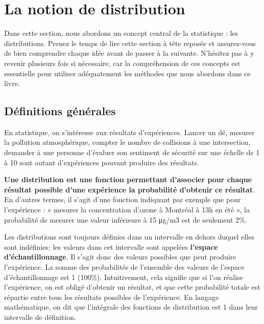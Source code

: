 \documentclass[
  11pt,
  french,
]{book}
\makeatletter
\newenvironment{kframev}{%
\medskip{}
\setlength{\fboxsep}{.8em}
 \def\at@end@of@kframev{}%
 \ifinner\ifhmode%
  \def\at@end@of@kframev{\end{minipage}}%
  \begin{minipage}{\columnwidth}%
 \fi\fi%
 \def\FrameCommand##1{\hskip\@totalleftmargin \hskip-\fboxsep
 \colorbox{shadebluecolor}{##1}\hskip-\fboxsep
     \hskip-\linewidth \hskip-\@totalleftmargin \hskip\columnwidth}%
 \MakeFramed {\advance\hsize-\width
   \@totalleftmargin\z@ \linewidth\hsize
   \@setminipage}}%
 {\par\unskip\endMakeFramed%
 \at@end@of@kframev}
\newenvironment{rmdblock}[1]
  {
  \begin{itemize}
  \renewcommand{\labelitemi}{
    \raisebox{-.7\height}[0pt][0pt]{
      {\setkeys{Gin}{width=3em,keepaspectratio}\texttt{[image: images/\#1]}}
    }
  }
  \setlength{\fboxsep}{1em}
  \begin{kframev}
  \small
  \item
  }
  {
  \end{kframev}
  \end{itemize}
  }
\newenvironment{bloc_objectif}
  {\begin{rmdblock}{objectif}}
  {\end{rmdblock}}
\makeatother
\begin{document}
\hypertarget{sect024}{%
\section{La notion de distribution}\label{sect024}}

\begin{bloc_objectif}

Dans cette section, nous abordons un concept central de la statistique : les distributions. Prenez le temps de lire cette section à tête reposée et assurez-vous de bien comprendre chaque idée avant de passer à la suivante. N'hésitez pas à y revenir plusieurs fois si nécessaire, car la compréhension de ces concepts est essentielle pour utiliser adéquatement les méthodes que nous abordons dans ce livre.

\end{bloc_objectif}

\hypertarget{duxe9finitions-guxe9nuxe9rales}{%
\subsection{Définitions générales}\label{duxe9finitions-guxe9nuxe9rales}}

En statistique, on s'intéresse aux résultats d'expériences. Lancer un dé, mesurer la pollution atmosphérique, compter le nombre de collisions à une intersection, demander à une personne d'évaluer son sentiment de sécurité sur une échelle de 1 à 10 sont autant d'expériences pouvant produire des résultats.

\textbf{Une distribution est une fonction permettant d'associer pour chaque résultat possible d'une expérience la probabilité d'obtenir ce résultat}. En d'autres termes, il s'agit d'une fonction indiquant par exemple que pour l'expérience : « mesurer la concentration d'ozone à Montréal à 13h en été », la probabilité de mesurer une valeur inférieure à 15 μg/m3 est de seulement 2\%.

Les distributions sont toujours définies dans un intervalle en dehors duquel elles sont indéfinies; les valeurs dans cet intervalle sont appelées \textbf{l'espace d'échantillonnage}. Il s'agit donc des valeurs possibles que peut produire l'expérience. La somme des probabilités de l'ensemble des valeurs de l'espace d'échantillonnage est 1 (100\%). Intuitivement, cela signifie que si l'on réalise l'expérience, on est obligé d'obtenir un résultat, et que cette probabilité totale est répartie entre tous les résultats possibles de l'expérience. En langage mathématique, on dit que l'intégrale des fonctions de distribution est 1 dans leur intervalle de définition.
\end{document}

